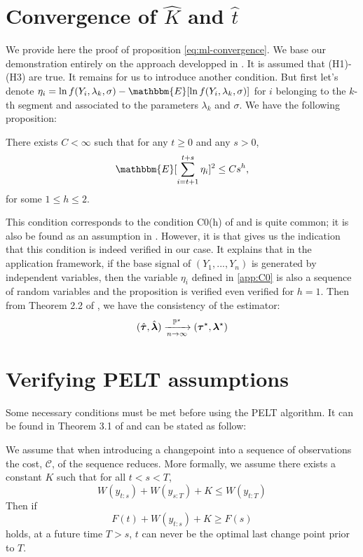\begin{appendices}
\section{Convergence of  \texorpdfstring{$\hat K$}{K} and \texorpdfstring{$\hat t$}{t}}

We provide here the proof of proposition \ref{eq:ml-convergence}. We base our demonstration entirely on the approach developped in \cite{Lavielle1997}. It is assumed that (H1)-(H3) are true. It remains for us to introduce another condition. But first let's denote $\eta_i = \ln f(Y_i,\lambda_{k},\sigma)-\mathbbm{E}[\ln f(Y_i,\lambda_{k},\sigma)]$ for $i$ belonging to the $k$-th segment and associated to the parameters $\lambda_{k}$ and $\sigma$. We have the following proposition: 

\begin{proposition}
     There exists $C < \infty$ such that for any $t\geq 0$ and any $s > 0$,
     \begin{equation}\label{app:C0}
     \mathbbm{E}[\sum_{i=t+1}^{t+s}\eta_i]^2\leq Cs^h,    
     \end{equation}
     for some $1\leq h\leq 2$.
\end{proposition}

This condition corresponds to the condition C0(h) of \cite{Lavielle1997} and is quite common; it is also be found as an assumption in \cite{He2010}. However, it is \cite{Lavielle1997} that gives us the indication that this condition is indeed verified in our case. It explains that in the application framework, if the base signal of $(Y_1,...,Y_n)$ is generated by independent variables, then the variable $\eta_i$ defined in \ref{app:C0} is also a sequence of random variables and the proposition is verified even verified for $h = 1$. Then from Theorem 2.2 of \cite{Lavielle1997}, we have the consistency of the estimator: 
$$ (\hat{\bm \tau}, \hat{\bm \lambda}) \xrightarrow[n\rightarrow \infty]{{\mathbb P}^{\star}}   (\bm \tau^{\star}, \bm \lambda^{\star})$$

\section{Verifying PELT assumptions}

Some necessary conditions must be met before using the PELT algorithm. It can be found in Theorem 3.1 of \cite{Killick2012} and can be stated as follow:  
\begin{proposition}
    We assume that  when  introducing a changepoint into a sequence of observations the  cost, $\mathcal{C}$, of the sequence reduces. More formally, we assume there exists a constant $K$ such that for all $t<s<T$,
    \begin{equation}\label{app:pelt}
      W(y_{t:s}) + W(y_{s:T}) + K \leq W(y_{t:T})  
    \end{equation}
    Then if
    \begin{equation}\label{app:pelt2}
      F(t)+W(y_{t:s})+K \geq F(s)  
    \end{equation}
    holds, at a future time $T>s$, $t$ can never be the optimal last change point prior to $T$.
\end{proposition}


\end{appendices}
